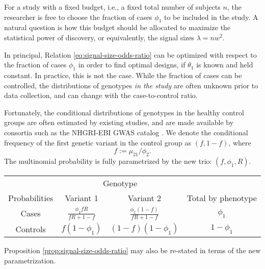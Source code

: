 For a study with a fixed budget, i.e., a fixed total number of subjects $n$, the researcher is free to choose the fraction of cases $\phi_1$ to be included in the study.
A natural question is how this budget should be allocated to maximize the statistical power of discovery, or equivalently, the signal sizes $\lambda=nw^2$.

In principal, Relation \eqref{eq:signal-size-odds-ratio} can be optimized with respect to the fraction of cases $\phi_1$ in order to find optimal designs, if $\theta_1$ is known and held constant.
In practice, this is not the case.
While the fraction of cases can be controlled, the distributions of genotypes \emph{in the study} are often unknown prior to data collection, and can change with the case-to-control ratio.

Fortunately, the conditional distributions of genotypes in the healthy control groups are often estimated by existing studies, and are made available by consortia such as the NHGRI-EBI GWAS catalog \citep{macarthur2016new}.
We denote the conditional frequency of the first genetic variant in the control group as $(f, 1-f)$, where
\begin{equation} \label{eq:RAF}
    f := \mu_{21} / \phi_2.
\end{equation}
The multinomial probability is fully parametrized by the new trio: $(f, \phi_1, R)$.
\begin{center}
    \begin{tabular}{cccc}
    \hline
    & \multicolumn{2}{c}{Genotype} \\
    \cline{2-3}
    Probabilities & Variant 1 & Variant 2 & Total by phenotype \\
    \hline
    Cases & $\frac{\phi_1fR}{fR+1-f}$ & $\frac{\phi_1(1-f)}{fR+1-f}$ & $\phi_1$ \\
    Controls & $f(1-\phi_1)$ & $(1-f)(1-\phi_1)$ & $1-\phi_1$ \\
    \hline
    \end{tabular}
\end{center}
Proposition \ref{prop:signal-size-odds-ratio} may also be re-stated in terms of the new parametrization.


